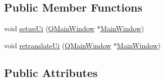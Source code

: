 \subsection*{Public Member Functions}
\begin{DoxyCompactItemize}
\item 
void \hyperlink{a00027_acf4a0872c4c77d8f43a2ec66ed849b58}{setup\+Ui} (\hyperlink{a00010}{Q\+Main\+Window} $\ast$\hyperlink{a00006}{Main\+Window})
\item 
void \hyperlink{a00027_a097dd160c3534a204904cb374412c618}{retranslate\+Ui} (\hyperlink{a00010}{Q\+Main\+Window} $\ast$\hyperlink{a00006}{Main\+Window})
\end{DoxyCompactItemize}
\subsection*{Public Attributes}
